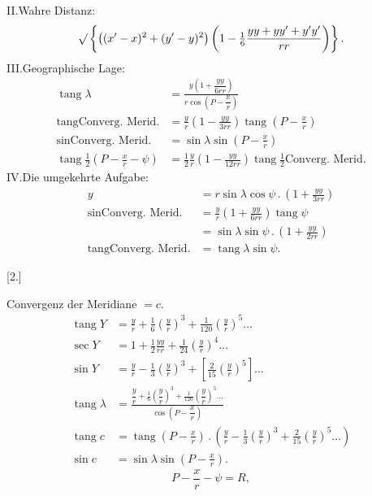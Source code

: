II.\quad Wahre Distanz:
\[
\surd\left\{\left((x'-x)^2+(y'-y)^2\right)
 \left(1-\tfrac16\frac{yy+yy'+y'y'}{rr}\right)\right\}.
\]
III.\quad Geographische Lage:
\[
\begin{aligned}
\operatorname{tang}\lambda&=\frac{y\left(1+\dfrac{yy}{6rr}\right)}{r\cos\left(P-\dfrac xr\right)}\\
\operatorname{tang}\text{Converg.\ Merid.}
 &=\frac yr\left(1-\frac{yy}{3rr}\right)\operatorname{tang}\left(P-\frac xr\right)\\
\sin\text{Converg.\ Merid.}&=\sin\lambda\sin\left(P-\frac xr\right)\\
\operatorname{tang}\tfrac12\left(P-\frac xr-\psi\right)
 &=\tfrac12\frac yr\left(1-\frac{yy}{12rr}\right)\operatorname{tang}\tfrac12
 \text{Converg.\ Merid.}
\end{aligned}
\]
IV.\quad Die umgekehrte Aufgabe:
\[
\begin{aligned}
y&=r\sin\lambda\cos\psi\,.\,\left(1+\frac{yy}{3rr}\right)\\
\sin\text{Converg.\ Merid.}&=\frac yr\left(1+\frac{yy}{6rr}\right)\operatorname{tang}\psi\\
 &=\sin\lambda\sin\psi\,.\,\left(1+\frac{yy}{2rr}\right)\\
\operatorname{tang}\text{Converg.\ Merid.}&=\operatorname{tang}\lambda\sin\psi.
\end{aligned}
\]

\begin{center}[2.]\end{center}
Convergenz der Meridiane \(=c\).
\[
\begin{aligned}
\operatorname{tang}Y&=\frac yr+\tfrac16\left(\frac yr\right)^3+
 \tfrac1{120}\left(\frac yr\right)^5\ldots\\
\sec Y&=1+\tfrac12\frac{yy}{rr}+\tfrac1{24}\left(\frac yr\right)^4\ldots\\
\sin Y&=\frac yr-\tfrac13\left(\frac yr\right)^3+
 \left[\tfrac2{15}\left(\frac yr\right)^5\right]\ldots\\
\operatorname{tang}\lambda&=
 \frac{\dfrac yr+\tfrac16\left(\dfrac yr\right)^3+\tfrac1{120}\left(\dfrac yr\right)^5\ldots}
 {\cos\left(P-\dfrac xr\right)}\\
\operatorname{tang}c&=\operatorname{tang}\left(P-\frac xr\right)\,.\,
 \left(\frac yr-\tfrac13\left(\frac yr\right)^3+\tfrac2{15}\left(\frac yr\right)^5\ldots\right)\\
\sin c&=\sin\lambda\sin\left(P-\frac xr\right).
\end{aligned}
\]
\[
P-\frac xr-\psi=R,
\]

